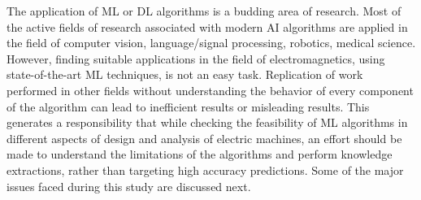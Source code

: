 The application of ML or DL algorithms is a budding area of research. Most of the active fields of research associated with modern AI algorithms are applied in the field of computer vision, language/signal processing, robotics, medical science. However, finding suitable applications in the field of electromagnetics, using state-of-the-art ML techniques, is not an easy task. Replication of work performed in other fields without understanding the behavior of every component of the algorithm can lead to inefficient results or misleading results. This generates a responsibility that while checking the feasibility of ML algorithms in different aspects of design and analysis of electric machines, an effort should be made to understand the limitations of the algorithms and perform knowledge extractions, rather than targeting high accuracy predictions. Some of the major issues faced during this study are discussed next.

